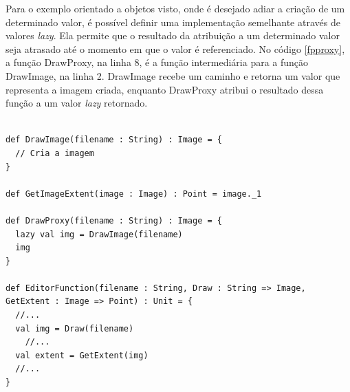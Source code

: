 Para o exemplo orientado a objetos visto, 
onde é desejado adiar a criação de um 
determinado valor, é possível definir 
uma implementação semelhante através 
de valores \textit{lazy}. Ela permite que 
o resultado da atribuição a um determinado 
valor seja atrasado até o momento em que 
o valor é referenciado\cite{functionalscala}. 
No código \ref{fpproxy}, a função DrawProxy, 
na linha 8, é a função intermediária para a 
função DrawImage, na linha 2. DrawImage recebe 
um caminho e retorna um valor que representa 
a imagem criada, enquanto DrawProxy atribui 
o resultado dessa função a um valor \textit{lazy} 
retornado.

\begin{lstlisting}[caption={Proxy Funcional},label=fpproxy]
    
def DrawImage(filename : String) : Image = {
  // Cria a imagem
}

def GetImageExtent(image : Image) : Point = image._1

def DrawProxy(filename : String) : Image = {
  lazy val img = DrawImage(filename)
  img
}

def EditorFunction(filename : String, Draw : String => Image, GetExtent : Image => Point) : Unit = {
  //...
  val img = Draw(filename)
    //...
  val extent = GetExtent(img)
  //...
}
    
\end{lstlisting}